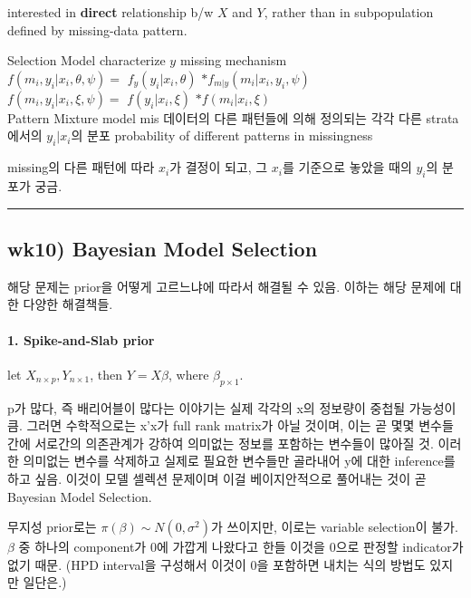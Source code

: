 \documentclass[
]{book}
\begin{document}
interested in \textbf{direct} relationship b/w \(X\) and \(Y\), rather than in subpopulation defined by missing-data pattern.

Selection Model \textbar{} characterize \(y\) \textbar{} missing mechanism \textbar{}\\
\(f(m_i, y_i \vert x_i, \theta, \psi) =\) \textbar{} \(f_y(y_i \vert x_i, \theta)\) \textbar{} \(\ast f_{m \vert y}(m_i \vert x_i, y_i, \psi)\) \textbar{}\\
\(f(m_i, y_i \vert x_i, \xi, \psi) =\) \textbar{} \(f(y_i \vert x_i, \xi)\) \textbar{} \(\ast f(m_i \vert x_i, \xi)\) \textbar{}\\
Pattern Mixture model \textbar{} mis 데이터의 다른 패턴들에 의해 정의되는 각각 다른 strata에서의 \(y_i \vert x_i\)의 분포 \textbar{} probability of different patterns in missingness \textbar{}

missing의 다른 패턴에 따라 \(x_i\)가 결정이 되고, 그 \(x_i\)를 기준으로 놓았을 때의 \(y_i\)의 분포가 궁금.

\begin{center}\rule{0.5\linewidth}{0.5pt}\end{center}

\hypertarget{wk10-bayesian-model-selection}{%
\subsection{wk10) Bayesian Model Selection}\label{wk10-bayesian-model-selection}}

해당 문제는 prior을 어떻게 고르느냐에 따라서 해결될 수 있음. 이하는 해당 문제에 대한 다양한 해결책들.

\hypertarget{spike-and-slab-prior}{%
\paragraph{1. Spike-and-Slab prior}\label{spike-and-slab-prior}}

let \(X_{n \times p} , Y_{n \times 1}\), then \(Y = X \beta\), where \(\beta_{p \times 1}\).

p가 많다, 즉 배리어블이 많다는 이야기는 실제 각각의 x의 정보량이 중첩될 가능성이 큼. 그러면 수학적으로는 x'x가 full rank matrix가 아닐 것이며, 이는 곧 몇몇 변수들 간에 서로간의 의존관계가 강하여 의미없는 정보를 포함하는 변수들이 많아질 것. 이러한 의미없는 변수를 삭제하고 실제로 필요한 변수들만 골라내어 y에 대한 inference를 하고 싶음. 이것이 모델 셀렉션 문제이며 이걸 베이지안적으로 풀어내는 것이 곧 Bayesian Model Selection.

무지성 prior로는 \(\pi(\beta) \sim N(0, \sigma^2)\)가 쓰이지만, 이로는 variable selection이 불가. \(\beta\) 중 하나의 component가 0에 가깝게 나왔다고 한들 이것을 0으로 판정할 indicator가 없기 때문. (HPD interval을 구성해서 이것이 0을 포함하면 내치는 식의 방법도 있지만 일단은.)
\end{document}
